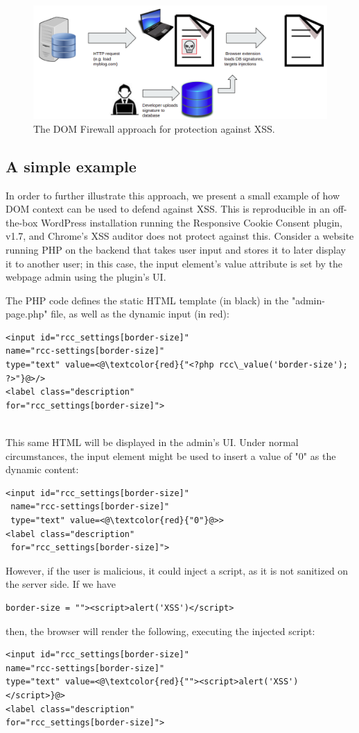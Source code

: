 \begin{figure}[h]
 	\includegraphics[scale=0.23]{img/dom_firewall.png}
 	\caption{The DOM Firewall approach for protection against XSS.}
 	\label{fig:dom_firewall}
 \end{figure}

\subsection{A simple example}

In order to further illustrate this approach, we present a small example of how DOM context can be used to defend against XSS. This is reproducible in an off-the-box WordPress installation running the Responsive Cookie Consent plugin, v1.7, and Chrome's XSS auditor does not protect against this. Consider a website running PHP on the backend that takes user input and stores it to later display it to another user; in this case, the input element's value attribute is set by the webpage admin using the plugin's UI.

The PHP code defines the static HTML template (in black) in the "admin-page.php" file, as well as the dynamic input (in red):

\begin{lstlisting}
<input id="rcc_settings[border-size]" 
name="rcc-settings[border-size]" 
type="text" value=<@\textcolor{red}{"<?php rcc\_value('border-size'); ?>"}@>/>
<label class="description"
for="rcc_settings[border-size]">
\end{lstlisting}
\
\\
This same HTML will be displayed in the admin's UI. Under normal circumstances, the input element might be used to insert a value of "0" as the dynamic content:
\\
\begin{lstlisting}
<input id="rcc_settings[border-size]" 
 name="rcc-settings[border-size]" 
 type="text" value=<@\textcolor{red}{"0"}@>>
<label class="description"
 for="rcc_settings[border-size]">
\end{lstlisting}
However, if the user is malicious, it could inject a script, as it is not sanitized on the server side. If we have
\begin{lstlisting}
border-size = ""><script>alert('XSS')</script>
\end{lstlisting}
then, the browser will render the following, executing the injected script:
\begin{lstlisting}
<input id="rcc_settings[border-size]" 
name="rcc-settings[border-size]" 
type="text" value=<@\textcolor{red}{""><script>alert('XSS')</script>}@>
<label class="description"
for="rcc_settings[border-size]">
\end{lstlisting}

